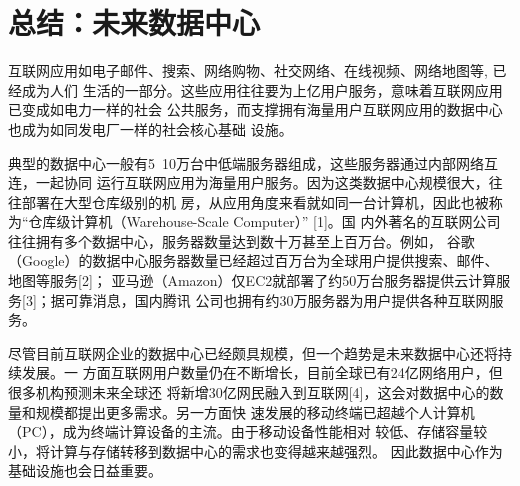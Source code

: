 

\chapter{总结：未来数据中心}
\label{cha:pardimpl}

互联网应用如电子邮件、搜索、网络购物、社交网络、在线视频、网络地图等, 已经成为人们
生活的一部分。这些应用往往要为上亿用户服务，意味着互联网应用已变成如电力一样的社会
公共服务，而支撑拥有海量用户互联网应用的数据中心也成为如同发电厂一样的社会核心基础
设施。

典型的数据中心一般有5~10万台中低端服务器组成，这些服务器通过内部网络互连，一起协同
运行互联网应用为海量用户服务。因为这类数据中心规模很大，往往部署在大型仓库级别的机
房，从应用角度来看就如同一台计算机，因此也被称为“仓库级计算机（Warehouse-Scale Computer）” [1]。国
内外著名的互联网公司往往拥有多个数据中心，服务器数量达到数十万甚至上百万台。例如，
谷歌（Google）的数据中心服务器数量已经超过百万台为全球用户提供搜索、邮件、地图等服务[2]；
亚马逊（Amazon）仅EC2就部署了约50万台服务器提供云计算服务[3]；据可靠消息，国内腾讯
公司也拥有约30万服务器为用户提供各种互联网服务。

尽管目前互联网企业的数据中心已经颇具规模，但一个趋势是未来数据中心还将持续发展。一
方面互联网用户数量仍在不断增长，目前全球已有24亿网络用户，但很多机构预测未来全球还
将新增30亿网民融入到互联网[4]，这会对数据中心的数量和规模都提出更多需求。另一方面快
速发展的移动终端已超越个人计算机（PC），成为终端计算设备的主流。由于移动设备性能相对
较低、存储容量较小，将计算与存储转移到数据中心的需求也变得越来越强烈。
因此数据中心作为基础设施也会日益重要。

